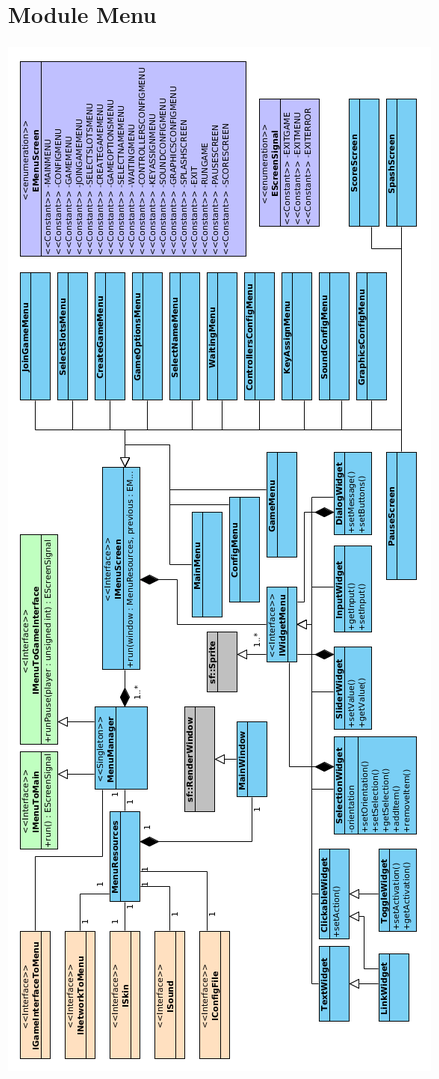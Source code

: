\subsection{Module Menu}

\begin{center}
\includegraphics[scale=0.49]{images/UML/menu.png}
\end{center}

